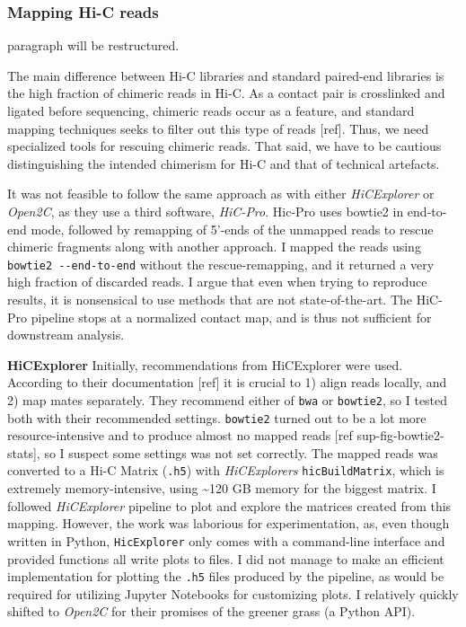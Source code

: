 \documentclass[
  11pt,
  a4paper,
]{scrbook}
\let\oldemph\emph
\renewcommand\emph[1]{\oldemph{\color{gray}#1}}
\begin{document}
\subsubsection{Mapping Hi-C reads}\label{mapping-hi-c-reads}

paragraph will be restructured.

The main difference between Hi-C libraries and standard paired-end
libraries is the high fraction of chimeric reads in Hi-C. As a contact
pair is crosslinked and ligated before sequencing, chimeric reads occur
as a feature, and standard mapping techniques seeks to filter out this
type of reads {[}ref{]}. Thus, we need specialized tools for rescuing
chimeric reads. That said, we have to be cautious distinguishing the
intended chimerism for Hi-C and that of technical artefacts.

It was not feasible to follow the same approach as
\citep{wang_reprogramming_2019} with either \emph{HiCExplorer} or
\emph{Open2C}, as they use a third software, \emph{HiC-Pro}. Hic-Pro
uses bowtie2 in end-to-end mode, followed by remapping of 5'-ends of the
unmapped reads to rescue chimeric fragments along with another approach.
I mapped the reads using \texttt{bowtie2\ -\/-end-to-end} without the
rescue-remapping, and it returned a very high fraction of discarded
reads. I argue that even when trying to reproduce results, it is
nonsensical to use methods that are not state-of-the-art. The HiC-Pro
pipeline stops at a normalized contact map, and is thus not sufficient
for downstream analysis.

\textbf{HiCExplorer} Initially, recommendations from HiCExplorer were
used. According to their documentation {[}ref{]} it is crucial to 1)
align reads locally, and 2) map mates separately. They recommend either
of \texttt{bwa} or \texttt{bowtie2}, so I tested both with their
recommended settings. \texttt{bowtie2} turned out to be a lot more
resource-intensive and to produce almost no mapped reads {[}ref
sup-fig-bowtie2-stats{]}, so I suspect some settings was not set
correctly. The mapped reads was converted to a Hi-C Matrix
(\texttt{.h5}) with \emph{HiCExplorers} \texttt{hicBuildMatrix}, which
is extremely memory-intensive, using \textasciitilde120 GB memory for
the biggest matrix. I followed \emph{HiCExplorer} pipeline to plot and
explore the matrices created from this mapping. However, the work was
laborious for experimentation, as, even though written in Python,
\texttt{HicExplorer} only comes with a command-line interface and
provided functions all write plots to files. I did not manage to make an
efficient implementation for plotting the \texttt{.h5} files produced by
the pipeline, as would be required for utilizing Jupyter Notebooks for
customizing plots. I relatively quickly shifted to \emph{Open2C} for
their promises of the greener grass (a Python API).
\end{document}
